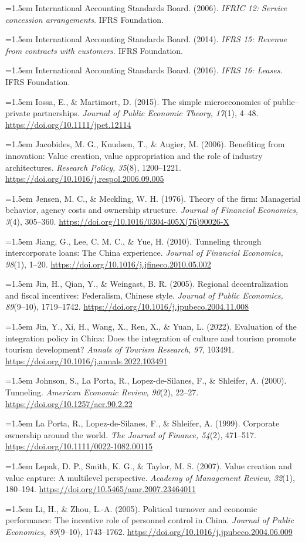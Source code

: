 \documentclass[review,3p,times]{elsarticle}
\def\refitem#1{\noindent\hangindent=1.5em\hangafter=1 #1\par\medskip}
\begin{document}
\refitem{International Accounting Standards Board. (2006). \emph{IFRIC 12: Service concession arrangements}. IFRS Foundation.}
\refitem{International Accounting Standards Board. (2014). \emph{IFRS 15: Revenue from contracts with customers}. IFRS Foundation.}
\refitem{International Accounting Standards Board. (2016). \emph{IFRS 16: Leases}. IFRS Foundation.}
\refitem{Iossa, E., \& Martimort, D. (2015). The simple microeconomics of public--private partnerships. \emph{Journal of Public Economic Theory, 17}(1), 4--48. \url{https://doi.org/10.1111/jpet.12114}}
\refitem{Jacobides, M. G., Knudsen, T., \& Augier, M. (2006). Benefiting from innovation: Value creation, value appropriation and the role of industry architectures. \emph{Research Policy, 35}(8), 1200--1221. \url{https://doi.org/10.1016/j.respol.2006.09.005}}
\refitem{Jensen, M. C., \& Meckling, W. H. (1976). Theory of the firm: Managerial behavior, agency costs and ownership structure. \emph{Journal of Financial Economics, 3}(4), 305--360. \url{https://doi.org/10.1016/0304-405X(76)90026-X}}
\refitem{Jiang, G., Lee, C. M. C., \& Yue, H. (2010). Tunneling through intercorporate loans: The China experience. \emph{Journal of Financial Economics, 98}(1), 1--20. \url{https://doi.org/10.1016/j.jfineco.2010.05.002}}
\refitem{Jin, H., Qian, Y., \& Weingast, B. R. (2005). Regional decentralization and fiscal incentives: Federalism, Chinese style. \emph{Journal of Public Economics, 89}(9--10), 1719--1742. \url{https://doi.org/10.1016/j.jpubeco.2004.11.008}}
\refitem{Jin, Y., Xi, H., Wang, X., Ren, X., \& Yuan, L. (2022). Evaluation of the integration policy in China: Does the integration of culture and tourism promote tourism development? \emph{Annals of Tourism Research, 97}, 103491. \url{https://doi.org/10.1016/j.annals.2022.103491}}
\refitem{Johnson, S., La Porta, R., Lopez-de-Silanes, F., \& Shleifer, A. (2000). Tunneling. \emph{American Economic Review, 90}(2), 22--27. \url{https://doi.org/10.1257/aer.90.2.22}}
\refitem{La Porta, R., Lopez-de-Silanes, F., \& Shleifer, A. (1999). Corporate ownership around the world. \emph{The Journal of Finance, 54}(2), 471--517. \url{https://doi.org/10.1111/0022-1082.00115}}
\refitem{Lepak, D. P., Smith, K. G., \& Taylor, M. S. (2007). Value creation and value capture: A multilevel perspective. \emph{Academy of Management Review, 32}(1), 180--194. \url{https://doi.org/10.5465/amr.2007.23464011}}
\refitem{Li, H., \& Zhou, L.-A. (2005). Political turnover and economic performance: The incentive role of personnel control in China. \emph{Journal of Public Economics, 89}(9--10), 1743--1762. \url{https://doi.org/10.1016/j.jpubeco.2004.06.009}}
\end{document}
